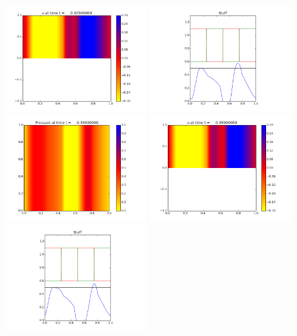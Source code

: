 \documentclass[11pt]{article}
\begin{document}
\includegraphics[width=0.475\textwidth]{frame0013fig1.png}
\vskip 10pt 
\includegraphics[width=0.475\textwidth]{frame0013fig3.png}
\vskip 10pt 
\includegraphics[width=0.475\textwidth]{frame0014fig0.png}
\includegraphics[width=0.475\textwidth]{frame0014fig1.png}
\vskip 10pt 
\includegraphics[width=0.475\textwidth]{frame0014fig3.png}
\end{document}
